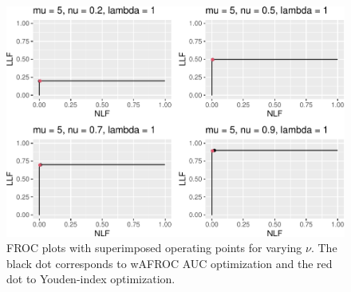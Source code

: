 \documentclass[
]{book}
\begin{document}
\begin{table}[H]

\caption{\label{tab:optim-op-point-high-performance-vary-nu-table-vary-all}Summary of optimizations for combinations of levels of $\mu$, $\lambda$ and $\nu$ parameters. FOM = figure of merit, $\zeta_1$ = threshold that optimizes FOM, wAFROC = wAFROC-AUC, ROC = ROC-AUC, Sp = specificity and Se = sensitivity.}
\centering
{}
\end{table}

\begin{figure}
\centering
\includegraphics{21-optim-op-point_files/figure-latex/optim-op-point-high-performance-vary-nu-vary-all-froc-1.pdf}
\caption{\label{fig:optim-op-point-high-performance-vary-nu-vary-all-froc}FROC plots with superimposed operating points for varying \(\nu\). The black dot corresponds to wAFROC AUC optimization and the red dot to Youden-index optimization.}
\end{figure}
\end{document}
